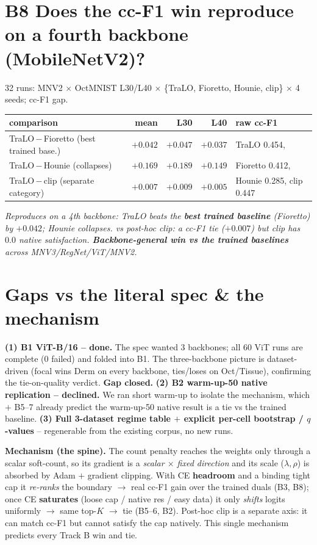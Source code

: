 \documentclass[10pt,a4paper]{article}
\newcommand{\vs}[2]{#1\,$-$\,#2}
\newcommand{\fnd}[1]{{\small\textit{#1}}\par}
\newcommand{\tbl}[1]{\begin{center}\footnotesize #1\end{center}}
\begin{document}
\section*{B8 \; Does the cc-F1 win reproduce on a fourth backbone (MobileNetV2)?}
{\footnotesize 32 runs: MNV2 $\times$ OctMNIST L30/L40 $\times$ \{TraLO, Fioretto, Hounie, clip\} $\times$ 4
seeds; cc-F1 gap.}
\tbl{\begin{tabular}{lrrr@{\qquad}l}
\toprule
comparison & mean & L30 & L40 & raw cc-F1 \\
\midrule
\vs{TraLO}{Fioretto} \footnotesize(best trained base.) & $\mathbf{+0.042}$ & $+0.047$ & $+0.037$ & TraLO 0.454, \\
\vs{TraLO}{Hounie} \footnotesize(collapses)            & $+0.169$ & $+0.189$ & $+0.149$ & Fioretto 0.412, \\
\vs{TraLO}{clip} \footnotesize(separate category)      & $+0.007$ & $+0.009$ & $+0.005$ & Hounie 0.285, clip 0.447 \\
\bottomrule
\end{tabular}}
\fnd{Reproduces on a 4th backbone: TraLO beats the \textbf{best trained baseline} (Fioretto) by $+0.042$;
Hounie collapses. vs post-hoc clip: a cc-F1 tie ($+0.007$) but clip has $0.0$ native satisfaction.
\textbf{Backbone-general win vs the trained baselines} across MNV3/RegNet/ViT/MNV2.}

\section*{Gaps vs the literal spec \& the mechanism}
{\small
\textbf{(1) B1 ViT-B/16 -- done.} The spec wanted 3 backbones; all 60 ViT runs are complete (0 failed) and
folded into B1. The three-backbone picture is dataset-driven (focal wins Derm on every backbone, ties/loses on
Oct/Tissue), confirming the tie-on-quality verdict. \textbf{Gap closed.}
\textbf{(2) B2 warm-up-50 native replication -- declined.} We ran short warm-up to isolate the mechanism, which
$+$ B5--7 already predict the warm-up-50 native result is a tie vs the trained baseline.
\textbf{(3) Full 3-dataset regime table $+$ explicit per-cell bootstrap / $q$-values} -- regenerable from the
existing corpus, no new runs.

\smallskip
\textbf{Mechanism (the spine).} The count penalty reaches the weights only through a scalar soft-count, so its
gradient is a \emph{scalar $\times$ fixed direction} and its scale ($\lambda,\rho$) is absorbed by Adam $+$
gradient clipping. With CE \textbf{headroom} and a binding tight cap it \emph{re-ranks} the boundary $\to$
real cc-F1 gain over the trained duals (B3, B8); once CE \textbf{saturates} (loose cap / native res / easy
data) it only \emph{shifts} logits uniformly $\to$ same top-$K$ $\to$ tie (B5--6, B2). Post-hoc clip is a
separate axis: it can match cc-F1 but cannot satisfy the cap natively. This single mechanism predicts every
Track B win and tie.}
\end{document}
